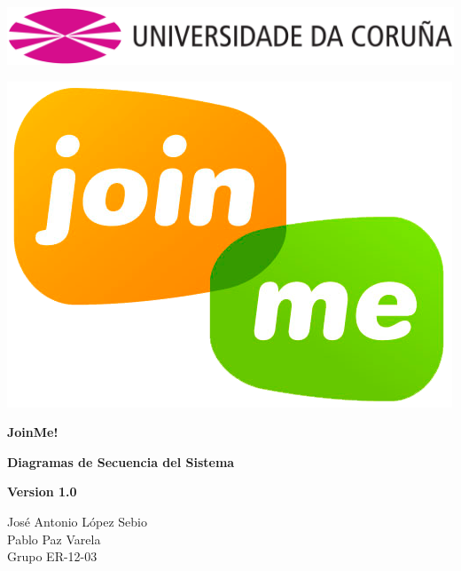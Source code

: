 \documentclass[12pt, a4paper, titlepage]{article}
\begin{document}


\begin{titlepage}

\includegraphics[width=15cm]{Imagenes/Simbolo_logo_UDC.png}

\vspace{3cm}

\begin{center}
\includegraphics[scale=0.3]{Imagenes/1a_Practica_ER_14-15.png}
\end{center}


\begin{flushright}
	
	\LARGE{\textbf{ JoinMe!}}
	
	\LARGE{\textbf{Diagramas de Secuencia del Sistema}}
	
	\large{\textbf{Version 1.0}}
	
\end{flushright}

\vspace{1cm}
\begin{center}
José Antonio López Sebio\\
Pablo Paz Varela\\
Grupo ER-12-03\\
\end{center}


\end{titlepage}
\end{document}
